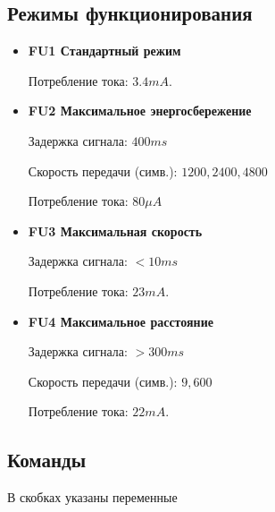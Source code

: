 \subsection{Режимы функционирования}

\begin{itemize}

\item \textbf{FU1 Стандартный режим }
   
Потребление тока: $3.4mA$.

\item \textbf{FU2 Максимальное энергосбережение}

Задержка сигнала: $400ms$
  
Скорость передачи (симв.): $1200, 2400, 4800$
 
Потребление тока: $80\mu A$

\item \textbf{FU3 Максимальная скорость}

Задержка сигнала: $< 10 ms$ 

Потребление тока: $23 mA$.

\item \textbf{FU4 Максимальное расстояние}

Задержка сигнала: $>300ms$ 

Скорость передачи (симв.): $9,600$ 

Потребление тока: $22mA$.

\end{itemize}


\subsection{Команды}


В скобках указаны переменные


